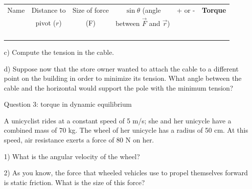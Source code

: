 \documentclass[12pt]{article}
\begin{document}
\Large
\begin{center}
\begin{tabular}{|c|c|c|c|c|c|}
\hline
Name & Distance to & Size of force & $\sin \theta$ (angle  & + or - & {\bf Torque} \\
     & pivot ($r$) & (F) & between $\vec F$ and $\vec r$) & & \\\hline
   
              &                         &                        &                                              &                    &                               \\ \hline
              &                         &                        &                                              &                    &                               \\ \hline
              &                         &                        &                                              &                    &                               \\ \hline
              &                         &                        &                                              &                    &                               \\ \hline
\end{tabular}
\end{center}
\normalsize
c) Compute the tension in the cable.

\vspace{3 in}

d) Suppose now that the store owner wanted to attach the cable to a different point on the building in order to minimize its tension. What angle between the
cable and the horizontal would support the pole with the minimum tension?


\newpage

\centerline{\large Question 3: torque in dynamic equilibrium}

A unicyclist rides at a constant speed of 5 m/s; she and her unicycle have a combined mass of 70 kg. The wheel of her unicycle has a radius of 50 cm. At this speed, air resistance exerts a force of 80 N on her.


1) What is the angular velocity of the wheel?
\vspace{1.2in}

2) As you know, the force that wheeled vehicles use to propel themselves forward is static friction. What is the size of this force?
\vspace {1.2in}
\end{document}
